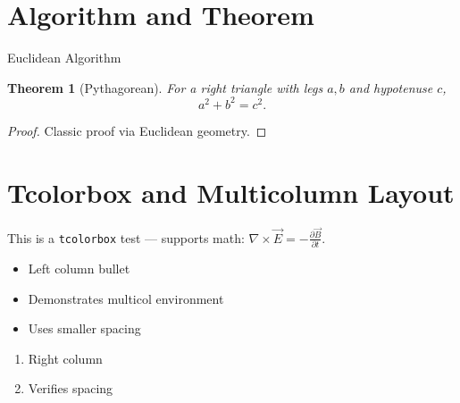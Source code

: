 \documentclass[12pt]{article}
\theoremstyle{plain}
\newtheorem{theorem}{Theorem}
\theoremstyle{definition}
\theoremstyle{remark}
\numberwithin{equation}{section}
\begin{document}

\section{Algorithm and Theorem}
\begin{algorithm}[H]
\SetAlgoLined
{}
\caption{Euclidean Algorithm}
\end{algorithm}

\begin{theorem}[Pythagorean]
For a right triangle with legs $a,b$ and hypotenuse $c$,
\[ a^2 + b^2 = c^2. \]
\end{theorem}

\begin{proof}
Classic proof via Euclidean geometry.
\end{proof}

\section{Tcolorbox and Multicolumn Layout}
\begin{tcolorbox}[title=Note, colback=Highlighter!30, colframe=AccentMuted]
This is a \texttt{tcolorbox} test — supports math:
$\nabla \times \vec{E} = -\frac{\partial \vec{B}}{\partial t}$.
\end{tcolorbox}

\begin{multicols}{2}
\begin{itemize}
\item Left column bullet
\item Demonstrates multicol environment
\item Uses smaller spacing
\end{itemize}
\columnbreak
\begin{enumerate}
\item Right column
\item Verifies spacing
\end{enumerate}
\end{multicols}

\end{document}
